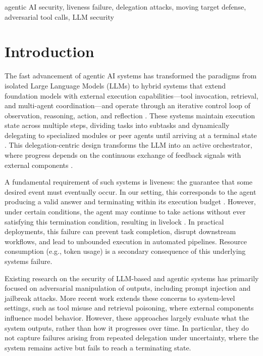\documentclass[conference]{IEEEtran}
\begin{document}
\begin{IEEEkeywords}
agentic AI security, liveness failure, delegation attacks, moving target defense, adversarial tool calls, LLM security
\end{IEEEkeywords}

\section{Introduction}

The fast advancement of agentic AI systems has transformed the paradigms from isolated Large Language Models (LLMs) to hybrid systems that extend foundation models with external execution capabilities—tool invocation, retrieval, and multi-agent coordination—and operate through an iterative control loop of observation, reasoning, action, and reflection \cite{yao2022react, shinn2023reflexion}. These systems maintain execution state across multiple steps, dividing tasks into subtasks and dynamically delegating to specialized modules or peer agents until arriving at a terminal state \cite{hong2023metagpt, qian2024chatdev}. This delegation-centric design transforms the LLM into an active orchestrator, where progress depends on the continuous exchange of feedback signals with external components \cite{wang2024survey, xi2025rise}.

A fundamental requirement of such systems is liveness: the guarantee that some desired event must eventually occur. In our setting, this corresponds to the agent producing a valid answer and terminating within its execution budget \cite{lamport1977proving}. However, under certain conditions, the agent may continue to take actions without ever satisfying this termination condition, resulting in livelock \cite{lamport1977proving}. In practical deployments, this failure can prevent task completion, disrupt downstream workflows, and lead to unbounded execution in automated pipelines. Resource consumption (e.g., token usage) is a secondary consequence of this underlying systems failure.

Existing research on the security of LLM-based and agentic systems has primarily focused on adversarial manipulation of outputs, including prompt injection and jailbreak attacks. More recent work extends these concerns to system-level settings, such as tool misuse and retrieval poisoning, where external components influence model behavior. However, these approaches largely evaluate what the system outputs, rather than how it progresses over time. In particular, they do not capture failures arising from repeated delegation under uncertainty, where the system remains active but fails to reach a terminating state.
\end{document}
